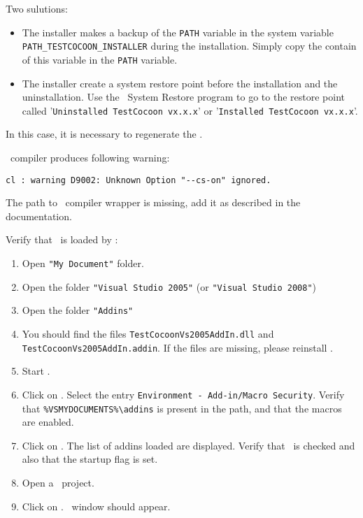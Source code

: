 
Two sulutions:
\begin{itemize}
\item The installer makes a backup of the \verb$PATH$ variable in the system variable \verb$PATH_TESTCOCOON_INSTALLER$ during the installation.
Simply copy the contain of this variable in the \verb$PATH$ variable.
\item The installer create a system restore point before the installation and the uninstallation. Use the \MicrosoftWindows\ System Restore program to go to the restore point called '\verb$Uninstalled TestCocoon vx.x.x$' or '\verb$Installed TestCocoon vx.x.x$'.
\end{itemize}

In this case, it is necessary to regenerate the \QtLibrary.

\VisualStudio\ compiler produces following warning:
\begin{verbatim}
cl : warning D9002: Unknown Option "--cs-on" ignored.
\end{verbatim}

The path to \CoverageScanner\ compiler wrapper is missing, add it as described in the documentation. 

Verify that \VisualStudioVsAddIn\ is loaded by \VisualStudio:
\begin{enumerate}
\item Open \verb$"My Document"$ folder.
\item Open the folder \verb$"Visual Studio 2005"$ (or \verb$"Visual Studio 2008"$)
\item Open the folder \verb$"Addins"$
\item You should find the files \verb$TestCocoonVs2005AddIn.dll$ and \verb$TestCocoonVs2005AddIn.addin$. If the files are missing, please reinstall \TestCocoon.
\item Start \VisualStudio.
\item Click on . Select the entry \verb$Environment - Add-in/Macro Security$. Verify that \verb$%VSMYDOCUMENTS%\addins$ is present in the path, and that the macros are enabled.
\item Click on . The list of addins loaded are displayed. Verify that \TestCocoon\ is checked and also that the startup flag is set. \newline
{}
\item Open a \CorCPlusPlus\ project.
\item Click on . \VisualStudioVsAddIn\ window should appear.
\end{enumerate}

